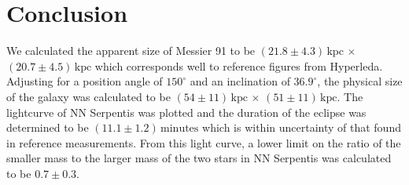 \documentclass[%
reprint,
amsmath,amssymb,
aps,
]{revtex4-2}
\begin{document}
	\section{Conclusion}
		We calculated the apparent size of Messier 91 to be $\left(21.8 \pm 4.3\right) \,\text{kpc}$ $\times$ $\left(20.7 \pm 4.5\right) \,\text{kpc}$ which corresponds well to reference figures from Hyperleda\cite{hyperleda}. Adjusting for a position angle of $150^\circ$ and an inclination of $36.9^\circ$, the physical size of the galaxy was calculated to be $\left(54 \pm 11\right) \,\text{kpc}$ $\times$ $\left(51 \pm 11\right) \,\text{kpc}$. The lightcurve of NN Serpentis was plotted and the duration of the eclipse was determined to be $(11.1 \pm 1.2)\,\text{minutes}$ which is within uncertainty of that found in reference measurements\cite{times}. From this light curve, a lower limit on the ratio of the smaller mass to the larger mass of the two stars in NN Serpentis was calculated to be $0.7 \pm 0.3$.
		
	\newpage
		
	\newpage
	\appendix
		
		
\end{document}
